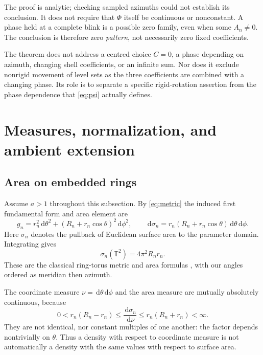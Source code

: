 \documentclass[11pt,a4paper]{article}
\theoremstyle{definition}
\theoremstyle{remark}
\newcommand{\T}{\mathbb T}
\newcommand{\dd}{\,\mathrm d}
\begin{document}
The proof is analytic; checking sampled azimuths could not
establish its conclusion. It does not require that $\Phi$
itself be continuous or nonconstant. A phase held at a complete
blink is a possible zero family, even when some $A_n\neq0$.
The conclusion is therefore zero \emph{pattern}, not necessarily
zero fixed coefficients.

The theorem does not address a centred choice $C=0$, a phase
depending on azimuth, changing shell coefficients, or an infinite
sum. Nor does it exclude nonrigid movement of level sets as
the three coefficients are combined with a changing phase.
Its role is to separate a specific rigid-rotation assertion
from the phase dependence that \eqref{eq:psi} actually defines.

\section{Measures, normalization, and ambient extension}
\label{sec:measures}
\subsection{Area on embedded rings}
Assume $a>1$ throughout this subsection. By
\eqref{eq:metric} the induced first fundamental form and area
element are
\begin{equation}
 g_n=r_n^2\dd\theta^2+(R_n+r_n\cos\theta)^2\dd\phi^2,
 \qquad
 \dd\sigma_n=r_n(R_n+r_n\cos\theta)\dd\theta\dd\phi.
 \label{eq:area}
\end{equation}
Here $\sigma_n$ denotes the pullback of Euclidean surface area
to the parameter domain. Integrating gives
\begin{equation}
 \sigma_n(\T^2)=4\pi^2R_nr_n.
 \label{eq:totalarea}
\end{equation}
These are the classical ring-torus metric and area formulas
\cite[Eqs.~22--24, 28--29]{weissteinTorus}, with our angles
ordered as meridian then azimuth.

The coordinate measure $\nu=\dd\theta\dd\phi$ and the area
measure are mutually absolutely continuous, because
\[
 0<r_n(R_n-r_n)\leq
   \frac{\dd\sigma_n}{\dd\nu}
 \leq r_n(R_n+r_n)<\infty.
\]
They are not identical, nor constant multiples of one another:
the factor depends nontrivially on $\theta$. Thus a density
with respect to coordinate measure is not automatically a
density with the same values with respect to surface area.
\end{document}
